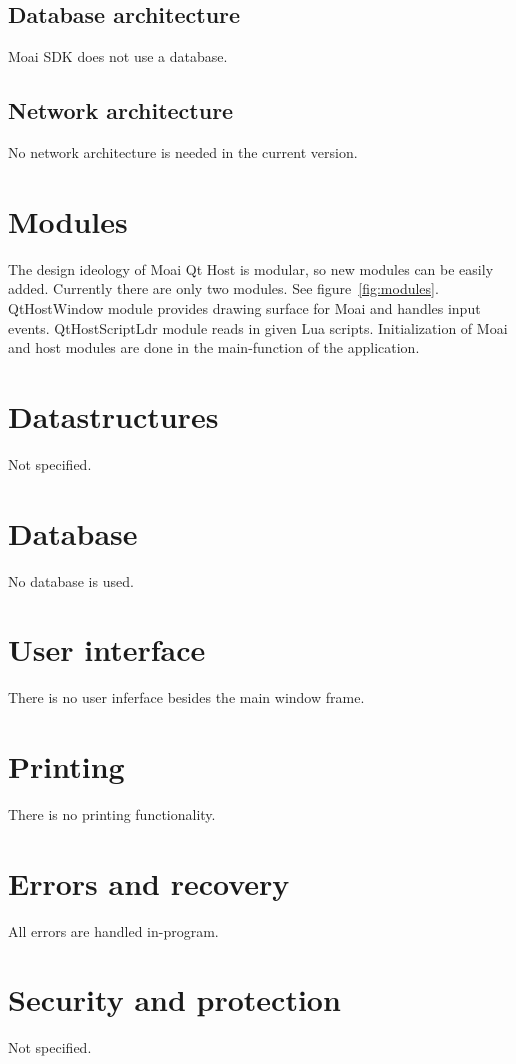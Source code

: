 \subsection{Database architecture}

Moai SDK does not use a database.

\subsection{Network architecture}

No network architecture is needed in the current version.

\section{Modules}

The design ideology of Moai Qt Host is modular, so new modules can be easily added. Currently there are only two modules. See figure~\ref{fig:modules}. QtHostWindow module provides drawing surface for Moai and handles input events. QtHostScriptLdr module reads in given Lua scripts. Initialization of Moai and host modules are done in the main-function of the application.


\section{Datastructures}

Not specified.

\section{Database}

No database is used.

\section{User interface}

There is no user inferface besides the main window frame.

\section{Printing}

There is no printing functionality.

\section{Errors and recovery}

All errors are handled in-program.

\section{Security and protection}

Not specified.
